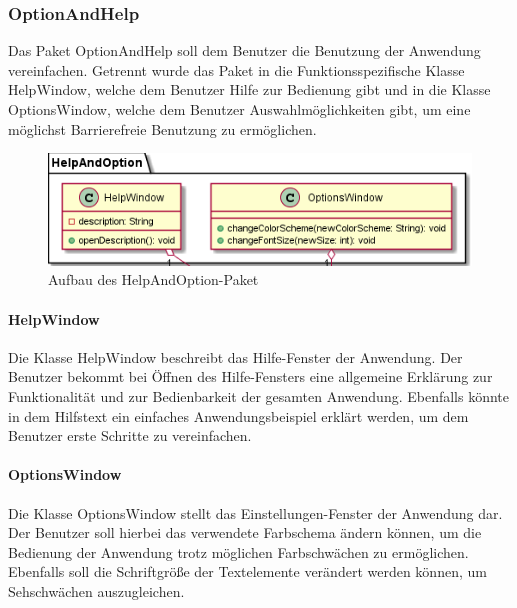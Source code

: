 \documentclass[parskip=full]{scrartcl}
\begin{document}
\subsubsection{OptionAndHelp}

Das Paket OptionAndHelp soll dem Benutzer die Benutzung der Anwendung vereinfachen. Getrennt wurde das Paket in die Funktionsspezifische Klasse HelpWindow, welche dem Benutzer Hilfe zur Bedienung gibt und in die Klasse OptionsWindow, welche dem Benutzer Auswahlmöglichkeiten gibt, um eine möglichst Barrierefreie Benutzung zu ermöglichen.

\begin{figure}[htbp]
	\begin{center}
		\includegraphics[width = 14cm]{Grafiken/View/HelpAndOptionNamespace.png}
		\caption{Aufbau des HelpAndOption-Paket}
		\label{Entwurf_Grob}
	\end{center}
\end{figure}

\paragraph{HelpWindow}

Die Klasse HelpWindow beschreibt das Hilfe-Fenster der Anwendung. Der Benutzer bekommt bei Öffnen des Hilfe-Fensters eine allgemeine Erklärung zur Funktionalität und zur Bedienbarkeit der gesamten Anwendung. Ebenfalls könnte in dem Hilfstext ein einfaches Anwendungsbeispiel erklärt werden, um dem Benutzer erste Schritte zu vereinfachen.

\paragraph{OptionsWindow}

Die Klasse OptionsWindow stellt das Einstellungen-Fenster der Anwendung dar. Der Benutzer soll hierbei das verwendete Farbschema ändern können, um die Bedienung der Anwendung trotz möglichen Farbschwächen zu ermöglichen. Ebenfalls soll die Schriftgröße der Textelemente verändert werden können, um Sehschwächen auszugleichen. 

\newpage
\end{document}
